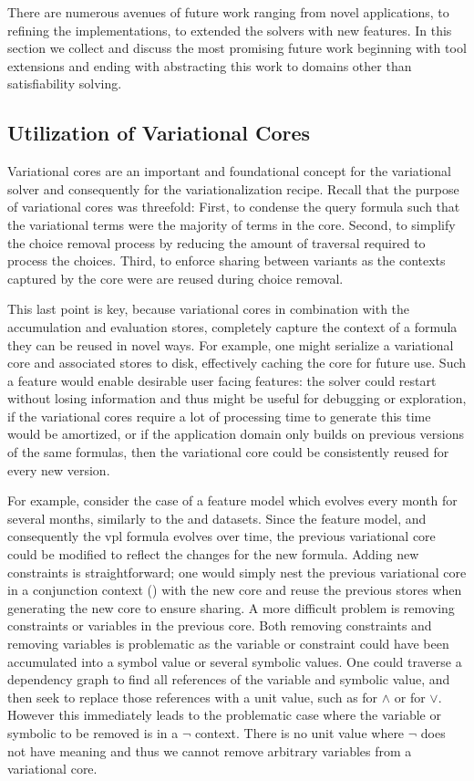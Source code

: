 \label{section:conclusion:future-work}
%
There are numerous avenues of future work ranging from novel applications, to
refining the implementations, to extended the solvers with new features. In this
section we collect and discuss the most promising future work beginning with
tool extensions and ending with abstracting this work to domains other than
satisfiability solving.

\subsection{Utilization of Variational Cores}
Variational cores are an important and foundational concept for the variational
solver and consequently for the variationalization recipe. Recall that the
purpose of variational cores was threefold: First, to condense the query formula
such that the variational terms were the majority of terms in the core. Second,
to simplify the choice removal process by reducing the amount of traversal
required to process the choices. Third, to enforce sharing between variants as
the contexts captured by the core were are reused during choice removal.

This last point is key, because variational cores in combination with the
accumulation and evaluation stores, completely capture the context of a formula
they can be reused in novel ways. For example, one might serialize a variational
core and associated stores to disk, effectively caching the core for future use.
Such a feature would enable desirable user facing features: the solver could
restart without losing information and thus might be useful for debugging or
exploration, if the variational cores require a lot of processing time to
generate this time would be amortized, or if the application domain only builds
on previous versions of the same formulas, then the variational core could be
consistently reused for every new version.

For example, consider the case of a feature model which evolves every month for
several months, similarly to the \fin{} and \auto{} datasets. Since the feature
model, and consequently the \ac{vpl} formula evolves over time, the previous
variational core could be modified to reflect the changes for the new formula.
Adding new constraints is straightforward; one would simply nest the previous
variational core in a conjunction context () with
the new core and reuse the previous stores when generating the new core to
ensure sharing. A more difficult problem is removing constraints or variables in
the previous core. Both removing constraints and removing variables is
problematic as the variable or constraint could have been accumulated into a
symbol value or several symbolic values. One could traverse a dependency graph
to find all references of the variable and symbolic value, and then seek to
replace those references with a unit value, such as \tru{} for $\wedge$ or
\fls{} for $\vee$. However this immediately leads to the problematic case where
the variable or symbolic to be removed is in a $\neg$ context. There is no unit
value where $\neg$ does not have meaning and thus we cannot remove arbitrary
variables from a variational core.

